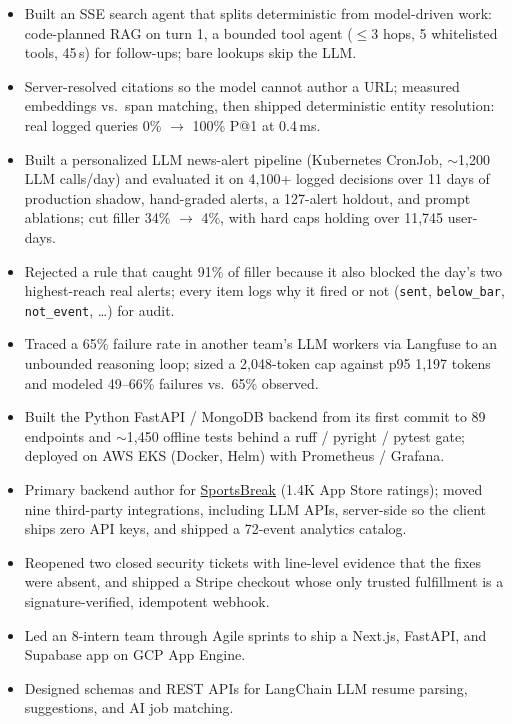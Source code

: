 \documentclass[11pt, letterpaper]{article}
\begin{document}
\begin{itemize}
  \item Built an SSE search agent that splits deterministic from model-driven work: code-planned RAG on turn 1, a bounded tool agent ($\le$3 hops, 5 whitelisted tools, 45\,s) for follow-ups; bare lookups skip the LLM.
  \item Server-resolved citations so the model cannot author a URL; measured embeddings vs.\ span matching, then shipped deterministic entity resolution: real logged queries 0\% $\to$ 100\% P@1 at 0.4\,ms.
  \item Built a personalized LLM news-alert pipeline (Kubernetes CronJob, $\sim$1{,}200 LLM calls/day) and evaluated it on 4{,}100+ logged decisions over 11 days of production shadow, hand-graded alerts, a 127-alert holdout, and prompt ablations; cut filler 34\% $\to$ 4\%, with hard caps holding over 11{,}745 user-days.
  \item Rejected a rule that caught 91\% of filler because it also blocked the day's two highest-reach real alerts; every item logs why it fired or not (\texttt{sent}, \texttt{below\_bar}, \texttt{not\_event}, \ldots) for audit.
  \item Traced a 65\% failure rate in another team's LLM workers via Langfuse to an unbounded reasoning loop; sized a 2{,}048-token cap against p95 1{,}197 tokens and modeled 49--66\% failures vs.\ 65\% observed.
  \item Built the Python FastAPI / MongoDB backend from its first commit to 89 endpoints and $\sim$1{,}450 offline tests behind a ruff / pyright / pytest gate; deployed on AWS EKS (Docker, Helm) with Prometheus / Grafana.
  \item Primary backend author for \href{https://apps.apple.com/app/id6762649287}{SportsBreak} (1.4K App Store ratings); moved nine third-party integrations, including LLM APIs, server-side so the client ships zero API keys, and shipped a 72-event analytics catalog.
  \item Reopened two closed security tickets with line-level evidence that the fixes were absent, and shipped a Stripe checkout whose only trusted fulfillment is a signature-verified, idempotent webhook.
\end{itemize}

\vspace{1pt}
\begin{itemize}
  \item Led an 8-intern team through Agile sprints to ship a Next.js, FastAPI, and Supabase app on GCP App Engine.
  \item Designed schemas and REST APIs for LangChain LLM resume parsing, suggestions, and AI job matching.
\end{itemize}
\end{document}
